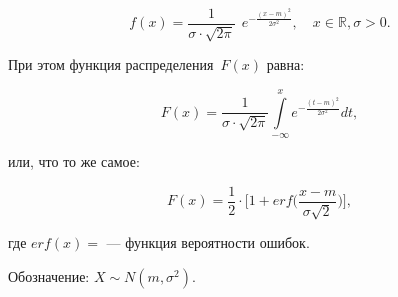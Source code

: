 \begin{equation}
	f(x) = \frac{1}{\sigma \cdot \sqrt{2\pi}}~~e^{\displaystyle-\frac{(x -
			m)^2}{2\sigma^2}}, \quad x \in \mathbb{R}, \sigma > 0.
\end{equation}

При этом функция распределения~$F(x)$ равна:

\begin{equation}
	F(x) = \frac{1}{\sigma \cdot \sqrt{2\pi}} \int\limits_{-\infty}^{x}
	e^{\displaystyle-\frac{(t - m)^2}{2\sigma^2}} dt,
\end{equation}

или, что то же самое:

\begin{equation}
	F(x) = \frac{1}{2} \cdot \bigg[1 + erf\bigg(\frac{x - m}{\sigma
		\sqrt{2}}\bigg)\bigg],
\end{equation}

где $erf(x) = $ 
 --- функция вероятности
ошибок.

Обозначение: $X \sim N(m, \sigma^2)$.
